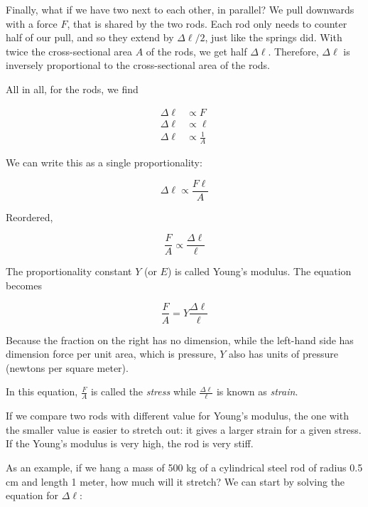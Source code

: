 Finally, what if we have two next to each other, in parallel? We pull downwards with a force $F$, that is shared by the two rods. Each rod only needs to counter half of our pull, and so they extend by $\Delta \ell/2$, just like the springs did. With twice the cross-sectional area $A$ of the rods, we get half $\Delta \ell$. Therefore, $\Delta \ell$ is inversely proportional to the cross-sectional area of the rods.

All in all, for the rods, we find

\begin{align}
\Delta \ell &\propto F\\
\Delta \ell &\propto \ell\\
\Delta \ell &\propto \frac{1}{A}
\end{align}

We can write this as a single proportionality:

\begin{equation}
\Delta \ell \propto \frac{F \ell}{A}
\end{equation}

Reordered,

\begin{equation}
\frac{F}{A} \propto \frac{\Delta \ell}{\ell}
\end{equation}

The proportionality constant $Y$ (or $E$) is called Young's modulus. The equation becomes

\begin{equation}
\frac{F}{A} = Y \frac{\Delta \ell}{\ell}
\end{equation}

Because the fraction on the right has no dimension, while the left-hand side has dimension force per unit area, which is pressure, $Y$ also has units of pressure (newtons per square meter).

In this equation, $\displaystyle \frac{F}{A}$ is called the \emph{stress} while $\displaystyle \frac{\Delta \ell}{\ell}$ is known as \emph{strain}.

If we compare two rods with different value for Young's modulus, the one with the smaller value is easier to stretch out: it gives a larger strain for a given stress. If the Young's modulus is very high, the rod is very stiff.

As an example, if we hang a mass of 500 kg of a cylindrical steel rod of radius 0.5 cm and length 1 meter, how much will it stretch? We can start by solving the equation for $\Delta \ell$:

